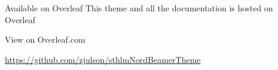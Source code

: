 \documentclass[\string~/GitHub/sthlmNordBeamerTheme/sthlmNordLightDemo.tex]{subfiles}
\begin{document}
\begin{frame}[c]{Available on Overleaf}
	This theme and all the documentation is hosted on Overleaf \\
	\vspace{1em}
	\begin{center}
		\large{View on Overleaf.com}

		\url{https://github.com/zjulson/sthlmNordBeamerTheme}
		\vspace{1em}


	\end{center}
\end{frame}
\end{document}
